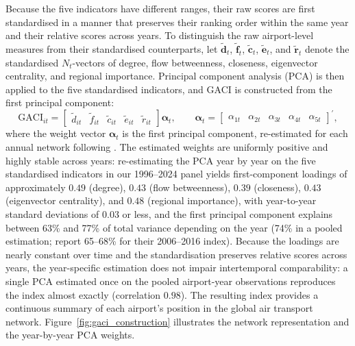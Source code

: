 Because the five indicators have different ranges, their raw scores are first standardised in a manner that preserves their ranking order within the same year and their relative scores across years. To distinguish the raw airport-level measures from their standardised counterparts, let $\tilde{\mathbf{d}}_t$, $\tilde{\mathbf{f}}_t$, $\tilde{\mathbf{c}}_t$, $\tilde{\mathbf{e}}_t$, and $\tilde{\mathbf{r}}_t$ denote the standardised $N_t$-vectors of degree, flow betweenness, closeness, eigenvector centrality, and regional importance. Principal component analysis (PCA) is then applied to the five standardised indicators, and GACI is constructed from the first principal component:
\begin{equation}
    \mathrm{GACI}_{it}
    =
    \begin{bmatrix}
        \tilde{d}_{it} & \tilde{f}_{it} & \tilde{c}_{it} & \tilde{e}_{it} & \tilde{r}_{it}
    \end{bmatrix}
    \boldsymbol{\alpha}_t,
    \qquad
    \boldsymbol{\alpha}_t
    =
    \begin{bmatrix}
        \alpha_{1t} &
        \alpha_{2t} &
        \alpha_{3t} &
        \alpha_{4t} &
        \alpha_{5t}
    \end{bmatrix}^{\prime},
    \label{eq:gaci_pca}
\end{equation}
where the weight vector $\boldsymbol{\alpha}_t$ is the first principal component, re-estimated for each annual network following \citet{Cheung_2020}. The estimated weights are uniformly positive and highly stable across years: re-estimating the PCA year by year on the five standardised indicators in our 1996--2024 panel yields first-component loadings of approximately $0.49$ (degree), $0.43$ (flow betweenness), $0.39$ (closeness), $0.43$ (eigenvector centrality), and $0.48$ (regional importance), with year-to-year standard deviations of $0.03$ or less, and the first principal component explains between 63\% and 77\% of total variance depending on the year (74\% in a pooled estimation; \citealt{Cheung_2020} report 65--68\% for their 2006--2016 index). Because the loadings are nearly constant over time and the standardisation preserves relative scores across years, the year-specific estimation does not impair intertemporal comparability: a single PCA estimated once on the pooled airport-year observations reproduces the index almost exactly (correlation $0.98$). The resulting index provides a continuous summary of each airport's position in the global air transport network. Figure~\ref{fig:gaci_construction} illustrates the network representation and the year-by-year PCA weights.

